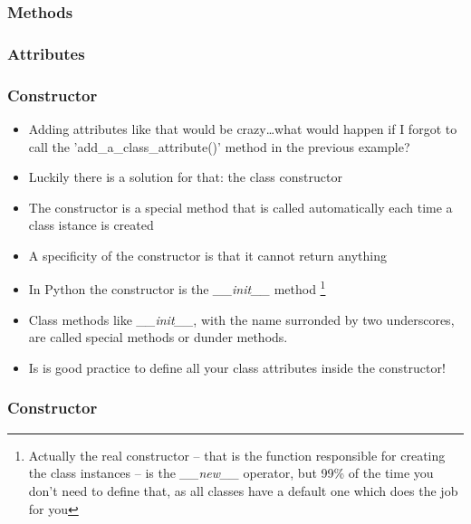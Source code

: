 \documentclass[9pt]{beamer}
\begin{document}
\begin{frame}
  \frametitle{Methods}
  
\end{frame}


\begin{frame}
  \frametitle{Attributes}
  
\end{frame}


\begin{frame}
  \frametitle{Constructor}
  
  \begin{itemize}
    \small
    \item Adding attributes like that would be crazy\dots what would happen if I forgot
          to call the 'add\_a\_class\_attribute()' method in the previous example?
    \medskip
    \item Luckily there is a solution for that: the class \alert{constructor}
    \medskip
    \item The constructor is a special method that is called automatically each time
          a class istance is created
    \medskip
    \item A specificity of the constructor is that it cannot return anything
    \medskip
    \item In Python the constructor is the \emph{\_\_init\_\_} method%
          \footnote{Actually the real constructor -- that is the function responsible for 
                    creating the class instances -- is the \emph{\_\_new\_\_} operator, but 99\% of the time you don't need
                    to define that, as all classes have a default one which does the job for you}           
    \medskip
    \item Class methods like \emph{\_\_init\_\_}, with the name surronded by two underscores,
          are called \alert{special} methods or \alert{dunder} methods.
    \medskip
    \item Is is good practice to define all your class attributes inside the constructor!

  \end{itemize}

\end{frame}


\begin{frame}
  \frametitle{Constructor}
  
\end{frame}
\end{document}

